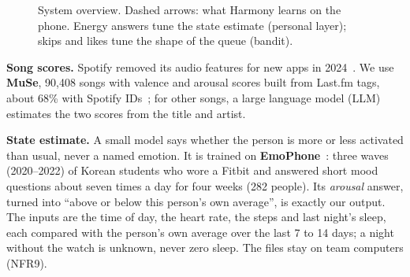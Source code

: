 \documentclass[conference]{IEEEtran}
\begin{document}
\begin{figure}[!t]
\centering
{}
\caption{System overview. Dashed arrows: what Harmony learns on the phone. Energy answers tune the state estimate (personal layer); skips and likes tune the shape of the queue (bandit).}
\label{fig:overview}
\end{figure}

\textbf{Song scores.} Spotify removed its audio features for new apps in 2024~\cite{spotify2024}. We use \textbf{MuSe}, 90,408 songs with valence and arousal scores built from Last.fm tags, about 68\% with Spotify IDs~\cite{muse}; for other songs, a large language model (LLM) estimates the two scores from the title and artist.

\textbf{State estimate.} A small model says whether the person is more or less activated than usual, never a named emotion. It is trained on \textbf{EmoPhone}~\cite{emophone}: three waves (2020--2022) of Korean students who wore a Fitbit and answered short mood questions about seven times a day for four weeks (282 people). Its \emph{arousal} answer, turned into ``above or below this person's own average'', is exactly our output. The inputs are the time of day, the heart rate, the steps and last night's sleep, each compared with the person's own average over the last 7 to 14 days; a night without the watch is unknown, never zero sleep. The files stay on team computers (NFR9).
\end{document}
